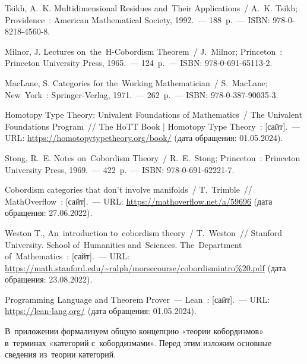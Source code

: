 \documentclass[a4paper,oneside]{article}
\begin{document}
\begin{thebibliography}{}
 Tsikh, A.~K. Multidimensional Residues and~Their Applications~/ A.~K. Tsikh; Providence~: American Mathematical Society, 1992.~— 188~p.~— ISBN: 978-0-8218-4560-8.

 Milnor, J. Lectures on~the~H-Cobordism Theorem~/ J.~Milnor; Princeton~: Princeton University Press, 1965.~— 124~p.~— ISBN: 978-0-691-65113-2.

 MacLane, S. Categories for the~Working Mathematician~/ S.~MacLane; New~York~: Springer-Verlag, 1971.~— 262~p.~— ISBN: 978-0-387-90035-3.

 Homotopy Type Theory: Univalent Foundations of Mathematics~/ The {Uni\-va\-lent} Foundations Program~//
The HoTT Book | Homotopy Type {The\-o\-ry}~: [сайт].~— URL: \url{https://homotopytypetheory.org/book/} (дата обращения: 01.05.2024).

 Stong, R.~E. Notes on~Cobordism Theory~/ R.~E.~Stong; Princeton~: Princeton University Press, 1969.~— 422~p.~— ISBN: 978-0-691-62221-7.

 Cobordism categories that don’t involve manifolds~/ T.~Trimble~//
{Math\-Over\-flow}~: [сайт].~— URL: \url{https://mathoverflow.net/a/59696} (дата обращения: 27.06.2022).

 Weston T., An~introduction to~cobordism theory~/ T.~Weston~//
{Stan\-ford} University. School of~Humanities and~Sciences.
The~Department of~{Math\-e\-mat\-ics}~: [сайт].~— URL: \url{https://math.stanford.edu/~ralph/morsecourse/cobordismintro%20.pdf} (дата обращения: 23.08.2022).

 Programming Language and Theorem Prover~— Lean~: [сайт].~— URL: \url{https://lean-lang.org/} (дата обращения: 01.05.2024).
\end{thebibliography}

\label{TheEnd}
\pagebreak

\renewcommand*{\theHsection}{appendix.\arabic{section}}
\renewcommand{\thesection}{\Alph{section}}

\setcounter{section}{1}
\setcounter{subsection}{0}

В~приложении формализуем общую концепцию «теории кобордизмов» в~терминах «категорий с~кобордизмами».
Перед этим изложим основные сведения из~теории категорий.







\pagebreak
\end{document}
